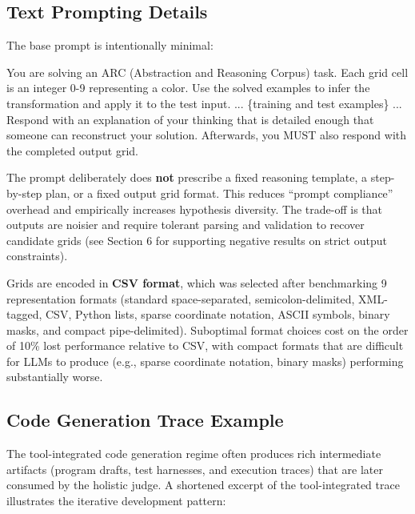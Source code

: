 \documentclass[10pt]{article}
\newenvironment{Shaded}{}{}
\newcommand{\NormalTok}[1]{#1}
\begin{document}
\hypertarget{text-prompting-details}{%
\subsection{Text Prompting Details}\label{text-prompting-details}}

The base prompt is intentionally minimal:

\begin{Shaded}
\begin{Highlighting}[]
\NormalTok{You are solving an ARC (Abstraction and Reasoning Corpus)}
\NormalTok{task. Each grid cell is an integer 0{-}9 representing a color.}
\NormalTok{Use the solved examples to infer the transformation and}
\NormalTok{apply it to the test input.}
\NormalTok{...}
\NormalTok{\{training and test examples\}}
\NormalTok{...}
\NormalTok{Respond with an explanation of your thinking that is detailed}
\NormalTok{enough that someone can reconstruct your solution. Afterwards,}
\NormalTok{you MUST also respond with the completed output grid.}
\end{Highlighting}
\end{Shaded}

The prompt deliberately does \textbf{not} prescribe a fixed reasoning
template, a step-by-step plan, or a fixed output grid format. This
reduces ``prompt compliance'' overhead and empirically increases
hypothesis diversity. The trade-off is that outputs are noisier and
require tolerant parsing and validation to recover candidate grids (see
Section 6 for supporting negative results on strict output constraints).

Grids are encoded in \textbf{CSV format}, which was selected after
benchmarking 9 representation formats (standard space-separated,
semicolon-delimited, XML-tagged, CSV, Python lists, sparse coordinate
notation, ASCII symbols, binary masks, and compact pipe-delimited).
Suboptimal format choices cost on the order of 10\% lost performance
relative to CSV, with compact formats that are difficult for LLMs to
produce (e.g., sparse coordinate notation, binary masks) performing
substantially worse.

\hypertarget{code-generation-trace-example}{%
\subsection{Code Generation Trace
Example}\label{code-generation-trace-example}}

The tool-integrated code generation regime often produces rich
intermediate artifacts (program drafts, test harnesses, and execution
traces) that are later consumed by the holistic judge. A shortened
excerpt of the tool-integrated trace illustrates the iterative
development pattern:
\end{document}
